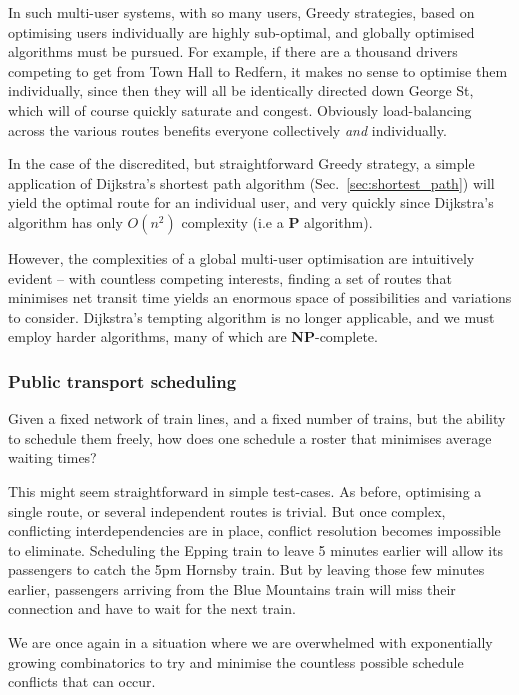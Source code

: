 In such multi-user systems, with so many users, {\sc Greedy} strategies, based on optimising users individually are highly sub-optimal, and globally optimised algorithms must be pursued. For example, if there are a thousand drivers competing to get from Town Hall to Redfern, it makes no sense to optimise them individually, since then they will all be identically directed down George St, which will of course quickly saturate and congest. Obviously load-balancing across the various routes benefits everyone collectively \textit{and} individually.

In the case of the discredited, but straightforward {\sc Greedy} strategy, a simple application of Dijkstra's shortest path algorithm (Sec.~\ref{sec:shortest_path}) will yield the optimal route for an individual user, and very quickly since Dijkstra's algorithm has only $O(n^2)$ complexity (i.e a \textbf{P} algorithm).

However, the complexities of a global multi-user optimisation are intuitively evident -- with countless competing interests, finding a set of routes that minimises net transit time yields an enormous space of possibilities and variations to consider. Dijkstra's tempting algorithm is no longer applicable, and we must employ harder algorithms, many of which are \textbf{NP}-complete.

\subsubsection{Public transport scheduling}

Given a fixed network of train lines, and a fixed number of trains, but the ability to schedule them freely, how does one schedule a roster that minimises average waiting times?

This might seem straightforward in simple test-cases. As before, optimising a single route, or several independent routes is trivial. But once complex, conflicting interdependencies are in place, conflict resolution becomes impossible to eliminate. Scheduling the Epping train to leave 5 minutes earlier will allow its passengers to catch the 5pm Hornsby train. But by leaving those few minutes earlier, passengers arriving from the Blue Mountains train will miss their connection and have to wait for the next train.

We are once again in a situation where we are overwhelmed with exponentially growing combinatorics to try and minimise the countless possible schedule conflicts that can occur. 

